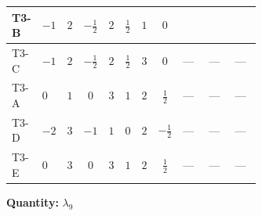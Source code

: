 \documentclass[8pt]{article}
\begin{document}
\begin{landscape}
\begin{longtable}{@{}llcccccc >{\raggedright\arraybackslash}p{0.21\linewidth} >{\raggedright\arraybackslash}p{0.21\linewidth} >{\raggedright\arraybackslash}p{0.21\linewidth}@{}}
T3-B & $-1$ & $2$ & $-\frac{1}{2}$ & $2$ & $\frac{1}{2}$ & $1$ & $0$ & \scriptsize\adjustbox{max width=\linewidth}{$\begin{gathered} {\lambda_9} (2 T_{\nu}^{(1)}+2 T_{\nu}^{(2)})\end{gathered}$} & \scriptsize\adjustbox{max width=\linewidth}{$\begin{gathered} +{\lambda_{10}} (\operatorname{Tr}\!\left({y_2}\,\left({y_1}\right)^{\dagger}\right)+2 {\lambda_{11}})\end{gathered}$} & \scriptsize\adjustbox{max width=\linewidth}{$\begin{gathered} +{\lambda_{11}} \operatorname{Tr}\!\left({y_2}\,\left({y_1}\right)^{\dagger}\right)\end{gathered}$} \\
\midrule
T3-C & $-1$ & $2$ & $-\frac{1}{2}$ & $2$ & $\frac{1}{2}$ & $3$ & $0$ & --- & --- & --- \\
\midrule
T3-A & $0$ & $1$ & $0$ & $3$ & $1$ & $2$ & $\frac{1}{2}$ & --- & --- & --- \\
\midrule
T3-D & $-2$ & $3$ & $-1$ & $1$ & $0$ & $2$ & $-\frac{1}{2}$ & --- & --- & --- \\
\midrule
T3-E & $0$ & $3$ & $0$ & $3$ & $1$ & $2$ & $\frac{1}{2}$ & --- & --- & --- \\
\midrule
\bottomrule
\end{longtable}
\clearpage
\noindent\textbf{Quantity: }$\lambda_{9}$\par\smallskip

\end{landscape}
\end{document}
